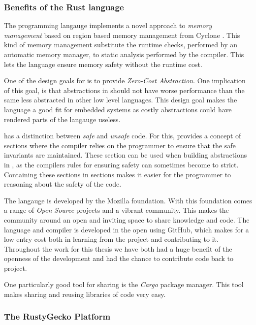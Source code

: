 \subsubsection{Benefits of the Rust language}
The {\rust} programming langauge implements a novel approach to \emph{memory management} based on region based memory management from Cyclone \cite{Grossman2002,Swamy2006}.
This kind of memory management substitute the runtime checks, performed by an automatic memory manager, to static analysis performed by the compiler.
This lets the {\rust} language ensure memory safety without the runtime cost.

One of the design goals for {\rust} is to provide \emph{Zero-Cost Abstraction}.
One implication of this goal, is that abstractions in {\rust} should not have worse performance than the same less abstracted in other low level languages.
This design goal makes the language a good fit for embedded systems as costly abstractions could have rendered parts of the langauge useless.

{\rust} has a distinction between \emph{safe} and \emph{unsafe} code.
For this, {\rust} provides a concept of {\unsafe} sections where the compiler relies on the programmer to ensure that the safe invariants are maintained.
These section can be used when building abstractions in {\rust}, as the compilers rules for ensuring safety can sometimes become to strict.
Containing these sections in {\unsafe} sections makes it easier for the programmer to reasoning about the safety of the code.

The {\rust} langauge is developed by the Mozilla foundation.
With this foundation comes a range of \emph{Open Source} projects and a vibrant community.
This makes the community around {\rust} an open and inviting space to share knowledge and code.
The {\rust} language and compiler is developed in the open using GitHub, which makes for a low entry cost both in learning from the project and contributing to it.
Throughout the work for this thesis we have both had a huge benefit of the openness of the development and had the chance to contribute code back to project.

One particularly good tool for sharing {\rust} is the \emph{Cargo} package manager.
This tool makes sharing and reusing libraries of code very easy.

\subsubsection{The RustyGecko Platform}

